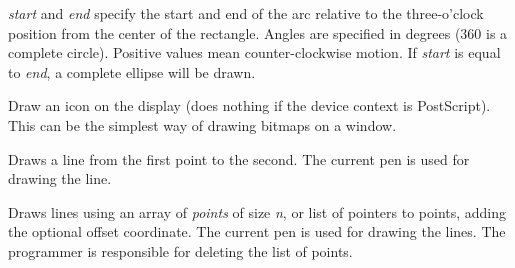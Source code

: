 {\it start} and {\it end} specify the start and end of the arc relative to the three-o'clock
position from the center of the rectangle. Angles are specified
in degrees (360 is a complete circle). Positive values mean
counter-clockwise motion. If {\it start} is equal to {\it end}, a
complete ellipse will be drawn.

\label{wxdcdrawicon}


Draw an icon on the display (does nothing if the device context is PostScript).
This can be the simplest way of drawing bitmaps on a window.

\label{wxdcdrawline}


Draws a line from the first point to the second. The current pen is used
for drawing the line.

\label{wxdcdrawlines}



Draws lines using an array of {\it points} of size {\it n}, or list of
pointers to points, adding the optional offset coordinate. The current
pen is used for drawing the lines.  The programmer is responsible for
deleting the list of points.



\label{wxdcdrawpolygon}



